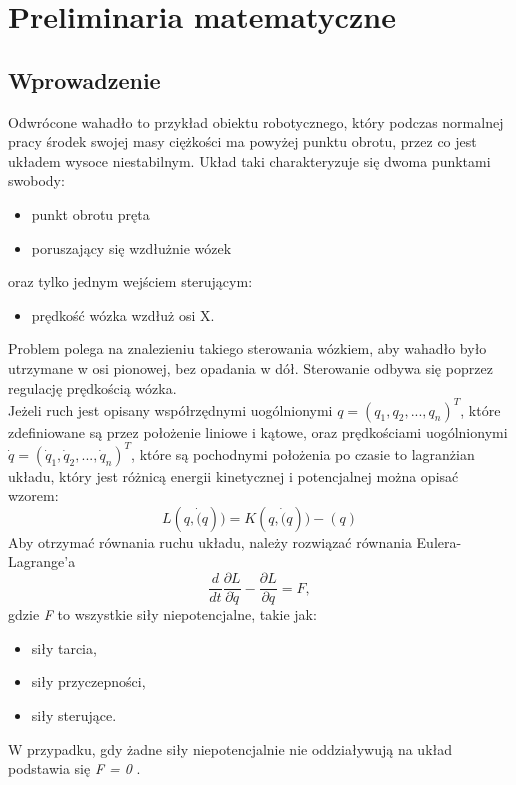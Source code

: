 \chapter{Preliminaria matematyczne}\label{ch:02}

\section{Wprowadzenie}\label{sec:intromat}

Odwrócone wahadło to przykład obiektu robotycznego, który podczas normalnej pracy środek swojej masy ciężkości ma powyżej punktu obrotu, przez co jest układem wysoce niestabilnym. Układ taki charakteryzuje się dwoma punktami swobody:
\begin{itemize}
    \item punkt obrotu pręta
    \item poruszający się wzdłużnie wózek
\end{itemize} 
oraz tylko jednym wejściem sterującym:
\begin{itemize}
    \item prędkość wózka wzdłuż osi X.
\end{itemize}
Problem polega na znalezieniu takiego sterowania wózkiem, aby wahadło było utrzymane w osi pionowej, bez opadania w dół. Sterowanie odbywa się poprzez regulację prędkością wózka. \\

Jeżeli ruch jest opisany współrzędnymi uogólnionymi \(q=(q_1,q_2,...,q_n)^T\), które zdefiniowane są przez położenie liniowe i kątowe, oraz prędkościami uogólnionymi \(\dot{q}=(\dot{q}_1,\dot{q}_2,...,\dot{q}_n)^T \), które są pochodnymi położenia po czasie to lagranżian układu, który jest różnicą energii kinetycznej i potencjalnej można opisać wzorem:
\begin{equation}
    L(q,\dot(q))=K(q,\dot(q))-(q)
\end{equation}
Aby otrzymać równania ruchu układu, należy rozwiązać równania Eulera-Lagrange’a
\begin{equation}
    \frac{d}{dt}\frac{\partial  L}{\partial \dot{q}}-\frac{\partial L}{\partial q}=F,
\end{equation} gdzie \textit{F} to wszystkie siły niepotencjalne, takie jak:
\begin{itemize}
    \item siły tarcia,
    \item siły przyczepności,
    \item siły sterujące.
\end{itemize}
W przypadku, gdy żadne siły niepotencjalnie nie oddziaływują na układ podstawia się  \textit{F = 0} \cite{TchMu18}.

